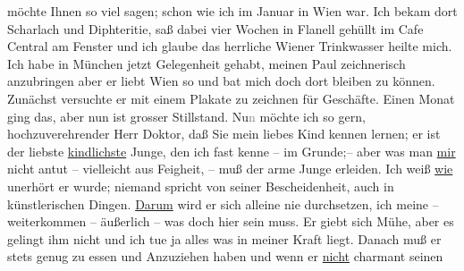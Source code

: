 \begin{ledgroupsized}[t]{13cm}
               möchte Ihnen so viel sagen; schon wie ich im Januar in
                  Wien war. Ich bekam dort Scharlach und
               Diphteritie, saß dabei vier Wochen in Flanell gehüllt im Cafe Central am Fenster und ich glaube das herrliche Wiener Trinkwasser heilte mich. Ich habe in München jetzt Gelegenheit gehabt, meinen Paul zeichnerisch anzubringen {\pb}aber er
               liebt Wien so und bat mich doch dort bleiben zu
               können. Zunächst versuchte er mit einem \label{K_L02653-2v}\label{K_L02653-2h} Plakate zu
               zeichnen für Geschäfte. Einen Monat ging das, aber nun ist grosser Stillstand.
                  Nu\textcolor{gray}{n} möchte ich so gern, hochzuverehrender Herr Doktor, daß Sie
               mein liebes Kind kennen
               lernen; er ist der liebste \uline{kindlichste}{ }Junge, den ich fast kenne –
               im Grunde;– aber was man \uline{mir} nicht antut – vielleicht
               aus Feigheit, – muß der arme Junge erleiden. Ich weiß \uline{wie} unerhört er
                  \label{K_L02653-3v}\label{K_L02653-3h} wurde; niemand spricht von seiner Bescheidenheit, auch in
               künstlerischen Dingen. {\pb}\uline{Darum} wird er sich alleine nie durchsetzen, ich meine
               – weiterkommen – äußerlich – was doch \introOben{}hier\introOben{} sein muss. Er
               giebt sich \strikeout{\textcolor{gray}{so}} Mühe, aber es gelingt ihm nicht und ich tue ja alles was in meiner Kraft
               liegt. Danach muß er stets genug zu essen und Anzuziehen haben und wenn er \uline{nicht} charmant seinen \label{K_L02653-5v}
\end{ledgroupsized}
